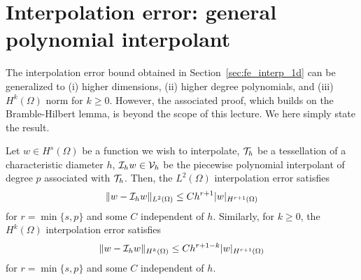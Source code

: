 \section{Interpolation error: general polynomial interpolant}
The interpolation error bound obtained in Section~\ref{sec:fe_interp_1d} can be generalized to (i) higher dimensions, (ii) higher degree polynomials, and (iii) $H^k(\Omega)$ norm for $k \geq 0$.  However, the associated proof, which builds on the Bramble-Hilbert lemma, is beyond the scope of this lecture.  We here simply state the result.
\begin{proposition}
Let $w \in H^s(\Omega)$ be a function we wish to interpolate, $\mathcal{T}_h$ be a tessellation of a characteristic diameter $h$, $\mathcal{I}_h w \in \mathcal{V}_h$ be the piecewise polynomial interpolant of degree $p$ associated with $\mathcal{T}_h$. Then, the $L^2(\Omega)$ interpolation error satisfies
\begin{align*}
  \| w - \mathcal{I}_h w \|_{L^2(\Omega)} \leq C h^{r+1} | w |_{H^{r+1}(\Omega)}
\end{align*}
for $r = \min\{ s,p \}$ and some $C$ independent of $h$. Similarly, for $k \geq 0$, the $H^k(\Omega)$ interpolation error satisfies 
\begin{align*}
  \| w - \mathcal{I}_h w \|_{H^k(\Omega)} \leq C h^{r+1-k} | w |_{H^{r+1}(\Omega)}
\end{align*}
for $r = \min\{ s,p \}$ and some $C$ independent of $h$.
\end{proposition}
